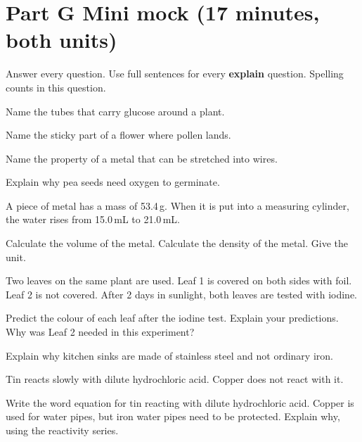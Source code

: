 \documentclass[11pt]{article}
\begin{document}
\clearpage
\section{Part G \textperiodcentered{} Mini mock (17 minutes, both units)}
Answer every question. Use full sentences for every \textbf{explain} question.
\Q Spelling counts in this question.
\par{} Name the tubes that carry glucose around a plant. \hfill{}
\par{} Name the sticky part of a flower where pollen lands. \hfill{}
\par{} Name the property of a metal that can be stretched into wires. \hfill{}\par\vspace{1mm}

\Q Explain why pea seeds need oxygen to germinate.

\Q A piece of metal has a mass of 53.4\,g. When it is put into a measuring cylinder, the water rises from 15.0\,mL to 21.0\,mL.
\par{} Calculate the volume of the metal.
 Calculate the density of the metal. Give the unit.

\Q Two leaves on the same plant are used. Leaf 1 is covered on both sides with foil. Leaf 2 is not covered. After 2 days in sunlight, both leaves are tested with iodine.
\par{} Predict the colour of each leaf after the iodine test.
 Explain your predictions.
 Why was Leaf 2 needed in this experiment?

\Q Explain why kitchen sinks are made of stainless steel and not ordinary iron.

\Q Tin reacts slowly with dilute hydrochloric acid. Copper does not react with it.
\par{} Write the word equation for tin reacting with dilute hydrochloric acid.
 Copper is used for water pipes, but iron water pipes need to be protected. Explain why, using the reactivity series.
\end{document}
